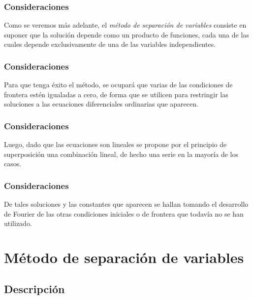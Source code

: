 \documentclass[12pt]{beamer}
\begin{document}
\begin{frame}
\frametitle{Consideraciones}
Como se veremos más adelante, el \emph{método de separación de variables} consiste en suponer que la solución depende como un producto de funciones, cada una de las cuales depende exclusivamente de una de las variables independientes.
\end{frame}
\begin{frame}
\frametitle{Consideraciones}
Para que tenga éxito el método, se ocupará que varias de las condiciones de frontera estén igualadas a cero, \pause de forma que se utilicen para restringir las soluciones a las ecuaciones diferenciales ordinarias que aparecen.
\end{frame}
\begin{frame}
\frametitle{Consideraciones}
Luego, dado que las ecuaciones son lineales se propone por el principio de superposición una combinación lineal, de hecho una serie en la mayoría de los casos.
\end{frame}
\begin{frame}
\frametitle{Consideraciones}
De tales soluciones y las constantes que aparecen se hallan tomando el desarrollo de Fourier de las otras condiciones iniciales o de frontera que todavía no se han utilizado.
\end{frame}

\section{Método de separación de variables}
\subsection{Descripción}
\end{document}
